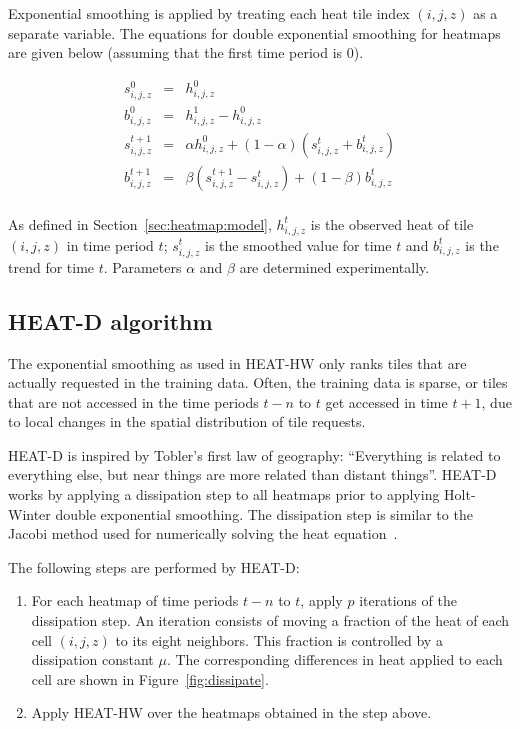 \documentclass[11pt, oneside]{report}
\begin{document}
Exponential smoothing is applied by treating each heat tile index $(i,j,z)$ as a separate variable. The equations for double exponential smoothing for heatmaps are given below (assuming that the first time period is $0$).

\begin{eqnarray*}
s_{i,j,z}^0 & = & h_{i,j,z}^0 \\
b_{i,j,z}^0 & = & h_{i,j,z}^1 - h_{i,j,z}^0 \\
s_{i,j,z}^{t+1} & = & \alpha h_{i,j,z}^0 + (1 - \alpha)(s_{i,j,z}^{t} + b_{i,j,z}^{t} ) \\
b_{i,j,z}^{t+1} & = & \beta (s_{i,j,z}^{t+1} - s_{i,j,z}^{t}) + (1 - \beta) b_{i,j,z}^{t}  \\
\end{eqnarray*}

As defined in Section~\ref{sec:heatmap:model}, $h_{i,j,z}^t$ is the observed heat of tile $(i,j,z)$ in time period $t$; $s_{i,j,z}^t$ is the smoothed value for time $t$ and $b_{i,j,z}^t$ is the trend for time $t$. Parameters $\alpha$ and $\beta$ are determined experimentally.

\subsection{HEAT-D algorithm}
\label{sec:heat:d}
The exponential smoothing as used in HEAT-HW only ranks tiles that are actually requested in the training data. Often, the training data is sparse, or tiles that are not accessed in the time periods $t-n$ to $t$ get accessed in time $t+1$, due to local changes in the spatial distribution of tile requests. 

HEAT-D is inspired by Tobler's first law of geography: ``Everything is related to everything else, but near things are more related than distant things''. HEAT-D works by applying a dissipation step to all heatmaps prior to applying Holt-Winter double exponential smoothing. The dissipation step is similar to the Jacobi method used for numerically solving the heat equation~\cite{templates}.

The following steps are performed by HEAT-D: 

\begin{enumerate}

\item For each heatmap of time periods $t-n$ to $t$, apply $p$ iterations of the dissipation step. An iteration consists of moving a fraction of the heat of each cell $(i,j,z)$ to its eight neighbors. This fraction is controlled by  a dissipation constant $\mu$. The corresponding differences in heat applied to each cell are shown in Figure~\ref{fig:dissipate}. 

\item Apply HEAT-HW over the heatmaps obtained in the step above. 

\end{enumerate}
\end{document}
